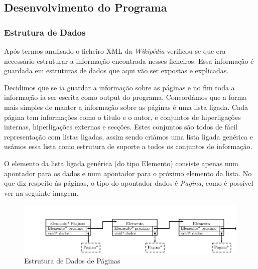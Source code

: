 \documentclass[11pt, a4paper, oneside]{article}
\begin{document}
\newpage

\subsection{Desenvolvimento do Programa}

\subsubsection{Estrutura de Dados}

Após termos analisado o ficheiro XML da \textit{Wikipédia} verificou-se que era necessário estruturar a informação encontrada nesses ficheiros. Essa informação é guardada em estruturas de dados que aqui vão ser expostas e explicadas. 

Decidimos que se ia guardar a informação sobre as páginas e no fim toda a informação ia ser escrita como output do programa. Concordámos que a forma mais simples de manter a informação sobre as páginas é uma lista ligada. Cada página tem informações como o título e o autor, e conjuntos de hiperligações internas, hiperligações externas e secções. Estes conjuntos são todos de fácil representação com listas ligadas, assim sendo criámos uma lista ligada genérica e usámos essa lista como estrutura de suporte a todos os conjuntos de informação.

O elemento da lista ligada genérica (do tipo Elemento) consiste apenas num apontador para os dados e num apontador para o próximo elemento da lista.
No que diz respeito às páginas, o tipo do apontador dados é \emph{Pagina}, como é possível ver na seguinte imagem.

\begin{figure}[h]
\begin{center}
\includegraphics[width=0.9\linewidth]{paginas}
\caption{Estrutura de Dados de Páginas}
\end{center}
\end{figure}
\end{document}
